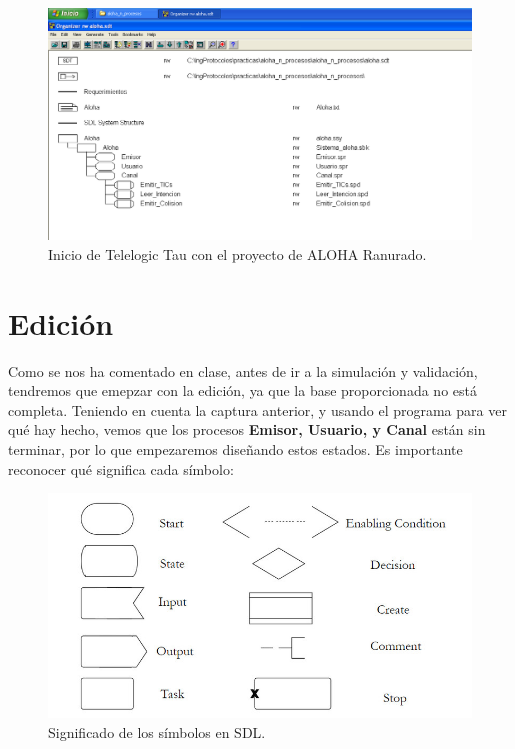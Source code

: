 \documentclass{article}
\begin{document}
\quad

\begin{figure}[h]
    \centering
    \includegraphics[width=1\linewidth]{src/Organizer-tltau.png}
    \caption{\label{fig:tltau} Inicio de Telelogic Tau con el proyecto de ALOHA Ranurado.}
\end{figure}

\newpage

\section{Edición}

Como se nos ha comentado en clase, antes de ir a la simulación y validación, tendremos que emepzar con la edición, ya que la base proporcionada no está completa. Teniendo en cuenta la captura anterior, y usando el programa para ver qué hay hecho, vemos que los procesos \textbf{Emisor, Usuario, y Canal} están sin terminar, por lo que empezaremos diseñando estos estados.
Es importante reconocer qué significa cada símbolo:

\begin{figure}[h]
    \centering
    \includegraphics[width=0.7\linewidth]{src/sdl-symbols.jpg}
    \caption{\label{fig:sdlsymbols} Significado de los símbolos en SDL.}
\end{figure}
\end{document}
